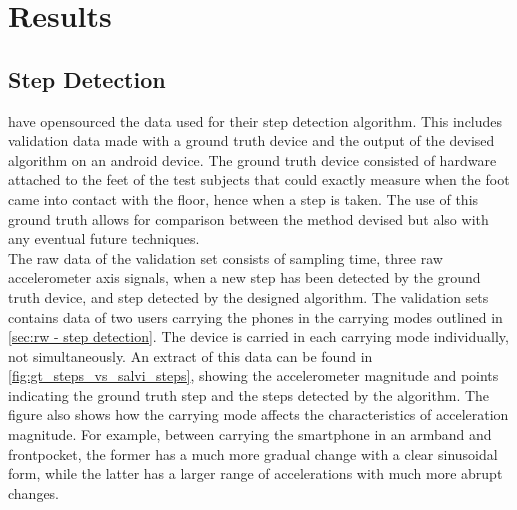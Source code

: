 \chapter{Results}

\section{Step Detection}
\citet{Salvi2018} have opensourced the data used for their step detection algorithm. This includes validation data made with a ground truth device and the output of the devised algorithm on an android device. The ground truth device consisted of hardware attached to the feet of the test subjects that could exactly measure when the foot came into contact with the floor, hence when a step is taken. The use of this ground truth allows for comparison between the method devised but also with any eventual future techniques.\\
The raw data of the validation set consists of sampling time, three raw accelerometer axis signals, when a new step has been detected by the ground truth device, and step detected by the designed algorithm. The validation sets contains data of two users carrying the phones in the carrying modes outlined in \cref{sec:rw - step detection}. The device is carried in each carrying mode individually, not simultaneously. An extract of this data can be found in \cref{fig:gt_steps_vs_salvi_steps}, showing the accelerometer magnitude and points indicating the ground truth step and the steps detected by the \citet{Salvi2018} algorithm. The figure also shows how the carrying mode affects the characteristics of acceleration magnitude. For example, between carrying the smartphone in an armband and frontpocket, the former has a much more gradual change with a clear sinusoidal form, while the latter has a larger range of accelerations with much more abrupt changes. 

